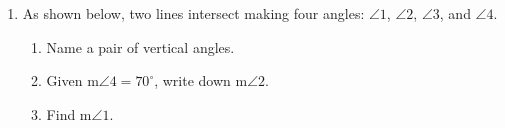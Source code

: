 \begin{enumerate}
  \item As shown below, two lines intersect making four angles: $\angle 1$, $\angle 2$, $\angle 3$, and $\angle 4$.
  \begin{multicols}{2}  
    \begin{enumerate}
      \item Name a pair of vertical angles. \vspace{1.5cm}
      \item Given m$\angle 4 = 70^\circ$, write down m$\angle 2$. \vspace{1.5cm}
      \item Find m$\angle 1$. \vspace{2cm}
    \end{enumerate}
  \end{multicols}


\end{enumerate}

